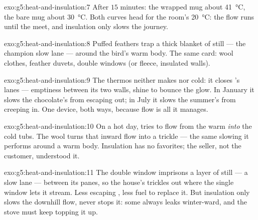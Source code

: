 \begin{solution}{exo:g5:heat-and-insulation:7}
After $15$ minutes: the wrapped mug about \qty{41}{\celsius}, the
bare mug about \qty{30}{\celsius}. Both curves head for the room's
\qty{20}{\celsius}: the flow runs until the  meet, and
insulation only slows the journey.
\end{solution}

\begin{solution}{exo:g5:heat-and-insulation:8}
Puffed feathers trap a thick blanket of still  --- the champion
slow lane --- around the bird's warm body. The same card: wool
clothes, feather duvets, double windows (or fleece, insulated
walls).
\end{solution}

\begin{solution}{exo:g5:heat-and-insulation:9}
The thermos neither makes  nor cold: it closes 's lanes ---
emptiness between its two walls, shine to bounce the glow. In
January it slows the chocolate's  from escaping out; in July it
slows the summer's  from creeping in. One device, both ways,
because flow is all it manages.
\end{solution}

\begin{solution}{exo:g5:heat-and-insulation:10}
On a hot day,  tries to flow from the warm  \emph{into} the
cold tubs. The wool turns that inward flow into a trickle --- the
same slowing it performs around a warm body. Insulation has no
favorites; the seller, not the customer, understood it.
\end{solution}

\begin{solution}{exo:g5:heat-and-insulation:11}
The double window imprisons a layer of still  --- a slow lane
--- between its panes, so the house's  trickles out where the
single window lets it stream. Less escaping , less fuel to
replace it. But insulation only slows the downhill flow, never
stops it: some  always leaks winter-ward, and the stove must
keep topping it up.
\end{solution}
